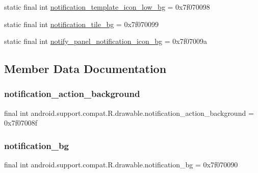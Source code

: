 \begin{DoxyCompactItemize}
\item 
static final int \mbox{\hyperlink{classandroid_1_1support_1_1compat_1_1R_1_1drawable_a0b6c638ec19c3a21b0f3b82ab4af62fe}{notification\+\_\+template\+\_\+icon\+\_\+low\+\_\+bg}} = 0x7f070098
\item 
static final int \mbox{\hyperlink{classandroid_1_1support_1_1compat_1_1R_1_1drawable_a6ab5153e2c67f18967cc5d392013321d}{notification\+\_\+tile\+\_\+bg}} = 0x7f070099
\item 
static final int \mbox{\hyperlink{classandroid_1_1support_1_1compat_1_1R_1_1drawable_ac2f70454d50b1ec6c8a6a761a78edcb2}{notify\+\_\+panel\+\_\+notification\+\_\+icon\+\_\+bg}} = 0x7f07009a
\end{DoxyCompactItemize}


\subsection{Member Data Documentation}
\mbox{\label{classandroid_1_1support_1_1compat_1_1R_1_1drawable_a5a0ff2bac77963f6f055c8a58fa8cddc}} 
\subsubsection{\texorpdfstring{notification\+\_\+action\+\_\+background}{notification\_action\_background}}
{\footnotesize\ttfamily final int android.\+support.\+compat.\+R.\+drawable.\+notification\+\_\+action\+\_\+background = 0x7f07008f\hspace{0.3cm}{\ttfamily [static]}}

\mbox{\label{classandroid_1_1support_1_1compat_1_1R_1_1drawable_ac1c881403cf01387a0e98a7570b876b5}} 
\subsubsection{\texorpdfstring{notification\+\_\+bg}{notification\_bg}}
{\footnotesize\ttfamily final int android.\+support.\+compat.\+R.\+drawable.\+notification\+\_\+bg = 0x7f070090\hspace{0.3cm}{\ttfamily [static]}}

